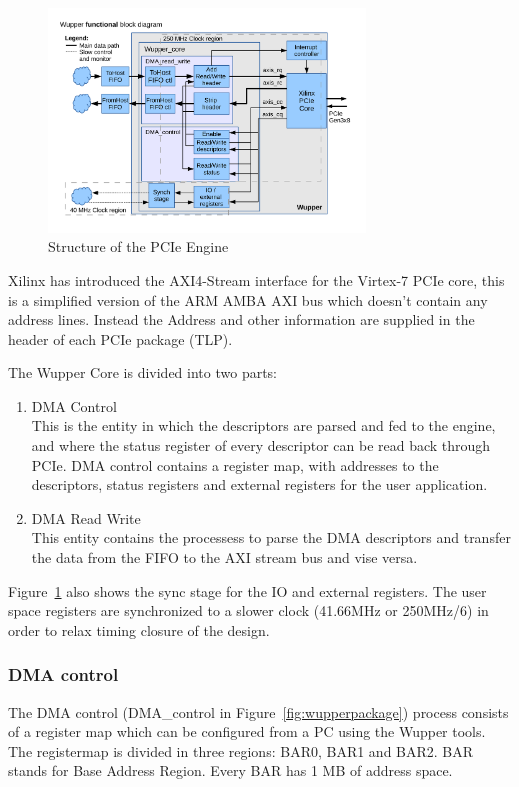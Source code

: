 \begin{figure}[H]
	\centering
	\includegraphics[trim=0mm 0cm 0mm 1cm,width=0.75\textwidth, page=1]{figures/wupper_structure.pdf}
	\caption{Structure of the PCIe Engine}
	\label{fig:pcie_core_structure}
\end{figure}

Xilinx has introduced the AXI4-Stream interface \cite{ug761} for the Virtex-7 PCIe core, this is a simplified version of the ARM AMBA AXI bus \cite{arm}  which doesn't contain any address lines. Instead the Address and other information are supplied in the header of each PCIe package (TLP). 

The Wupper Core is divided into two parts:

\begin{enumerate}
	\item DMA Control \\This is the entity in which the descriptors are parsed and fed to the engine, and where the status register of every descriptor can be read back through PCIe. DMA control contains a register map, with addresses to the descriptors, status registers and external registers for the user application.
	\item DMA Read Write \\This entity contains the processess to parse the DMA descriptors and transfer the data from the FIFO to the AXI stream bus and vise versa.
\end{enumerate}

Figure~\ref{fig:pcie_core_structure} also shows the sync stage for the IO and external registers. The user space registers are synchronized to a slower clock (41.66MHz or 250MHz/6) in order to relax timing closure of the design. 

\subsubsection {DMA control} 
The DMA control (DMA\_control in Figure~\ref{fig:wupperpackage}) process consists of a register map which can be configured from a PC using the Wupper tools. The registermap is divided in three regions: BAR0, BAR1 and BAR2. BAR stands for Base Address Region. Every BAR has 1 MB of address space.


